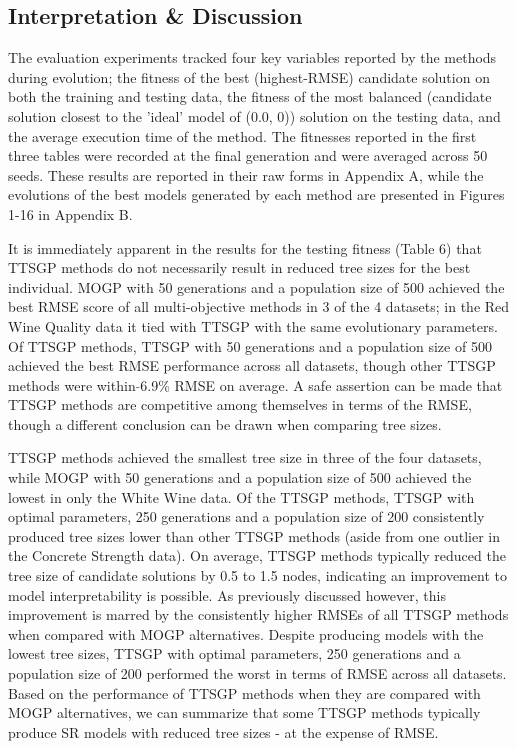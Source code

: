 \documentclass[a4paper, twocolumn]{article}
\begin{document}
\subsection{Interpretation \& Discussion}
The evaluation experiments tracked four key variables reported by the methods during evolution; the fitness of the best (highest-RMSE) candidate solution on both the training and testing data, the fitness of the most balanced (candidate solution closest to the 'ideal' model of (0.0, 0)) solution on the testing data, and the average execution time of the method. The fitnesses reported in the first three tables were recorded at the final generation and were averaged across 50 seeds. These results are reported in their raw forms in Appendix A, while the evolutions of the best models generated by each method are presented in Figures 1-16 in Appendix B.

It is immediately apparent in the results for the testing fitness (Table 6) that TTSGP methods do not necessarily result in reduced tree sizes for the best individual. MOGP with 50 generations and a population size of 500 achieved the best RMSE score of all multi-objective methods in 3 of the 4 datasets; in the Red Wine Quality data it tied with TTSGP with the same evolutionary parameters. Of TTSGP methods, TTSGP with 50 generations and a population size of 500 achieved the best RMSE performance across all datasets, though other TTSGP methods were within $\tilde{}$6.9\% RMSE on average. A safe assertion can be made that TTSGP methods are competitive among themselves in terms of the RMSE, though a different conclusion can be drawn when comparing tree sizes. 

TTSGP methods achieved the smallest tree size in three of the four datasets, while MOGP with 50 generations and a population size of 500 achieved the lowest in only the White Wine data. Of the TTSGP methods, TTSGP with optimal parameters, 250 generations and a population size of 200 consistently produced tree sizes lower than other TTSGP methods (aside from one outlier in the Concrete Strength data). On average, TTSGP methods typically reduced the tree size of candidate solutions by 0.5 to 1.5 nodes, indicating an improvement to model interpretability is possible. As previously discussed however, this improvement is marred by the consistently higher RMSEs of all TTSGP methods when compared with MOGP alternatives. Despite producing models with the lowest tree sizes, TTSGP with optimal parameters, 250 generations and a population size of 200 performed the worst in terms of RMSE across all datasets. Based on the performance of TTSGP methods when they are compared with MOGP alternatives, we can summarize that some TTSGP methods typically produce SR models with reduced tree sizes - at the expense of RMSE.
\end{document}
